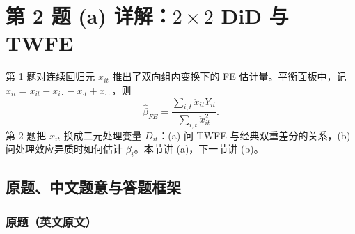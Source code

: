 
\section{第 2 题 (a) 详解：\texorpdfstring{$2\times2$}{2x2} DiD 与 TWFE}\label{sec:U17b-2a}

第 1 题对连续回归元 $x_{it}$ 推出了双向组内变换下的 FE 估计量。平衡面板中，记 $\ddot x_{it}=x_{it}-\bar x_{i\cdot}-\bar x_{\cdot t}+\bar x_{\cdot\cdot}$，则
\begin{equation}\label{eq:U17b-fe}
\hat\beta_{FE}=\frac{\sum_{i,t}\ddot x_{it}Y_{it}}{\sum_{i,t}\ddot x_{it}^2}.
\end{equation}
第 2 题把 $x_{it}$ 换成二元处理变量 $D_{it}$：(a) 问 TWFE 与经典双重差分的关系，(b) 问处理效应异质时如何估计 $\beta_i$。本节讲 (a)，下一节讲 (b)。

\subsection{原题、中文题意与答题框架}

\subsubsection{原题（英文原文）}

